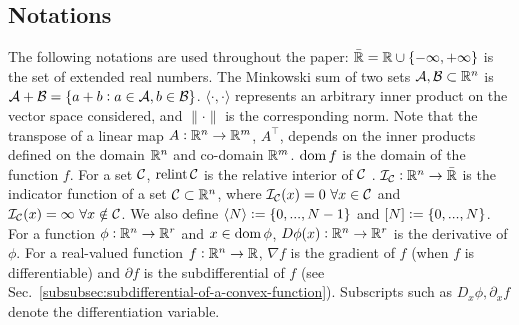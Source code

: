 \subsection{Notations}
\label{subsec:notations}

The following notations are used throughout the paper:
%
$\bar{\mathbb{R}} = \mathbb{R} \cup \{-\infty, +\infty\}$ is the set of extended real numbers.
The Minkowski sum of two sets $\mathcal{A}, \mathcal{B} \subset \mathbb{R}^n$ is $\mathcal{A} + \mathcal{B} = \{a+b: a \in \mathcal{A}, b \in \mathcal{B}\}$.
$\langle \cdot, \cdot \rangle$ represents an arbitrary inner product on the vector space considered, and $\lVert \cdot \rVert$ is the corresponding norm.
Note that the transpose of a linear map $A: \mathbb{R}^n \rightarrow \mathbb{R}^m$, $A^\top$, depends on the inner products defined on the domain $\mathbb{R}^n$ and co-domain $\mathbb{R}^m$.
$\operatorname{dom}{f}$ is the domain of the function $f$. %
For a set $\mathcal{C}$, $\operatorname{relint}{\mathcal{C}}$ is the relative interior of $\mathcal{C}$ \cite[Sec.~2.1.3]{boyd2004convex}.
$\mathcal{I}_{\mathcal{C}}: \mathbb{R}^n \rightarrow \bar{\mathbb{R}}$ is the indicator function of a set $\mathcal{C} \subset \mathbb{R}^n$, where $\mathcal{I}_{\mathcal{C}}(x) = 0 \ \forall x \in \mathcal{C}$ and $\mathcal{I}_{\mathcal{C}}(x) = \infty \ \forall x \notin \mathcal{C}$.
%
We also define $\langle N \rangle := \{0, ..., N-1\}$ and $[N] := \{0, ..., N\}$.
For a function $\phi: \mathbb{R}^n \rightarrow \mathbb{R}^r$ and $x \in \operatorname{dom}{\phi}$, $D\phi(x): \mathbb{R}^n \rightarrow\mathbb{R}^r$ is the derivative of $\phi$.
For a real-valued function $f: \mathbb{R}^n \rightarrow \mathbb{R}$, $\nabla f$ is the gradient of $f$ (when $f$ is differentiable) and $\partial f$ is the subdifferential of $f$ (see Sec.~\ref{subsubsec:subdifferential-of-a-convex-function}).
Subscripts such as $D_x \phi, \partial_x f$ denote the differentiation variable.

